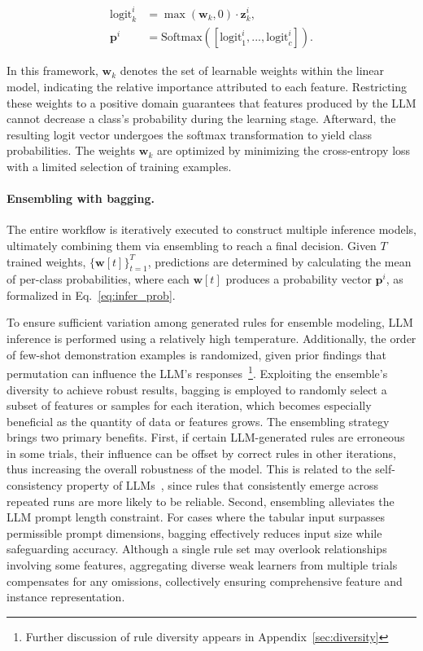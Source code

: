 \begin{align}
\text{logit}_k^i &= \max(\mathbf{w}_k, 0) \cdot \mathbf{z}_k^i, \nonumber \\
\mathbf{p}^i &= \text{Softmax}({[\text{logit}_{1}^i, ..., \text{logit}_{c}^i]}). \label{eq:infer_prob}
\end{align}

In this framework, $\mathbf{w}_k$ denotes the set of learnable weights within the linear model, indicating the relative importance attributed to each feature. Restricting these weights to a positive domain guarantees that features produced by the LLM cannot decrease a class's probability during the learning stage. Afterward, the resulting logit vector undergoes the softmax transformation to yield class probabilities. The weights $\mathbf{w}_k$ are optimized by minimizing the cross-entropy loss with a limited selection of training examples.

\vspace*{-0.12in}
\paragraph{Ensembling with bagging.} The entire workflow is iteratively executed to construct multiple inference models, ultimately combining them via ensembling to reach a final decision. Given $T$ trained weights, $\{\mathbf{w}[t]\}_{t=1}^T$, predictions are determined by calculating the mean of per-class probabilities, where each $\mathbf{w}[t]$ produces a probability vector $\mathbf{p}^i$, as formalized in Eq.~\ref{eq:infer_prob}.

To ensure sufficient variation among generated rules for ensemble modeling, LLM inference is performed using a relatively high temperature. Additionally, the order of few-shot demonstration examples is randomized, given prior findings that permutation can influence the LLM's responses~\cite{lu2022fantastically}\footnote{Further discussion of rule diversity appears in Appendix~\ref{sec:diversity}}. Exploiting the ensemble's diversity to achieve robust results, bagging is employed to randomly select a subset of features or samples for each iteration, which becomes especially beneficial as the quantity of data or features grows. The ensembling strategy brings two primary benefits. First, if certain LLM-generated rules are erroneous in some trials, their influence can be offset by correct rules in other iterations, thus increasing the overall robustness of the model. This is related to the self-consistency property of LLMs~\cite{wang2022self}, since rules that consistently emerge across repeated runs are more likely to be reliable. Second, ensembling alleviates the LLM prompt length constraint. For cases where the tabular input surpasses permissible prompt dimensions, bagging effectively reduces input size while safeguarding accuracy. Although a single rule set may overlook relationships involving some features, aggregating diverse weak learners from multiple trials compensates for any omissions, collectively ensuring comprehensive feature and instance representation.

